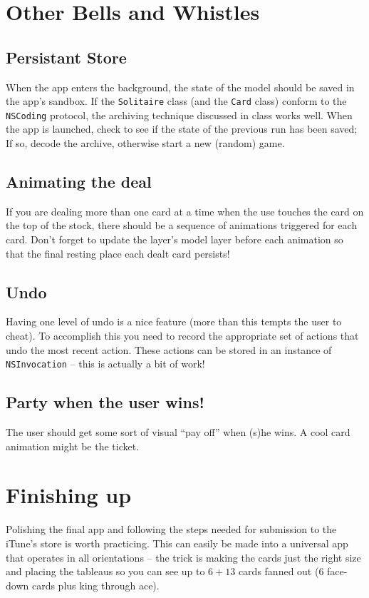 \documentclass[11pt]{article}
\begin{document}
\section{Other Bells and Whistles} \label{sec:bells-and-whistles}

\subsection{Persistant Store}

When the app enters the background, the state of the model should
be saved in the app's sandbox. If the {\tt Solitaire} class (and the
{\tt Card} class) conform to the {\tt NSCoding} protocol, 
the archiving technique discussed in class works well.
When the app is launched, check to see if the state of the
previous run has been saved; If so, decode the archive,
otherwise start a new (random) game.

\subsection{Animating the deal}

If you are dealing more than one card at a time when 
the use touches the card on the top of the stock, there
should be a sequence of animations triggered
for each card. Don't forget to update the layer's model
layer before each animation so that the final resting
place each dealt card persists!

\subsection{Undo}

Having one level of undo is a nice feature (more than this tempts
the user to cheat). To accomplish this you need to
record the appropriate set of actions that undo the most
recent action. These actions can be stored in
an instance of {\tt NSInvocation} 
-- this is actually a bit of work!

\subsection{Party when the user wins!}

The user should get some sort of visual ``pay off'' when
(s)he wins. A cool card animation might be the ticket.

\section{Finishing up}

Polishing the final app and following the steps needed
for submission to the iTune's store is worth practicing.
This can easily be made into a universal app that operates
in all orientations -- the trick
is making the cards just the right size and placing the
tableaus so you can see up to $6 + 13$ cards fanned out
(6 face-down cards plus king through ace).
\end{document}
